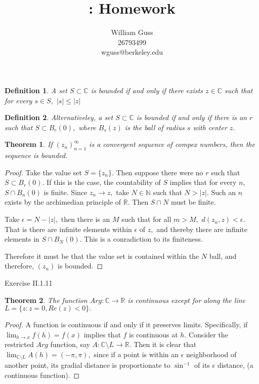 \documentclass[letter]{article}
\title{\bCLASS: Homework \bHWN}
\author{William Guss\\26793499\\wguss@berkeley.edu}
\newtheorem{theorem}{Theorem}
\newtheorem{definition}{Definition}
\newenvironment{menumerate}{%
  \edef\backupindent{\the\parindent}%
  \enumerate%
  \setlength{\parindent}{\backupindent}%
}{\endenumerate}
\begin{document}
\maketitle
\thispagestyle{empty}


\begin{menumerate}
	\item
	\begin{definition}
		A set $S \subset \mathbb{C}$ is bounded if and only if there exists $ z \in \mathbb{C}$ such that for every $s \in S,$ $|s| \leq |z|$
	\end{definition}
	\begin{definition}
		Alternativeley, a set $S \subset \mathbb{C}$ is bounded if and only if there is an $r$  such that $S \subset B_r(0),$ where $B_s(z)$ is the ball of radius $s$ with center $z.$
	\end{definition}
	\begin{theorem}
		If $(z_n)^\infty_{n=1}$ is a convergent sequence of compex numbers,
		then the sequence is bounded.
	\end{theorem}
	\begin{proof}
		Take the value set $S = \{z_n\}.$ Then suppose there were no $r$ such that $S \subset B_r(0)$. If this is the case, the countability of $S$ implies that for every $n$, $S \cap B_n(0)$ is finite.
		Since $z_n \to z,$ take $N \in \mathbb{N}$ such that $N > |z|.$ Such an $n$ exists by the archimedian principle of $\mathbb{R}.$ Then $S \cap N$ must be finite. 

		Take $\epsilon = N - |z|,$ then there is an $M$ such that for all $m > M,$ $d(z_n,z) < \epsilon.$ That is there are infinite elements within $\epsilon$ of $z,$ and thereby there are infinite elements in $S \cap B_N(0).$ This is a conradiction to its finiteness.

		Therefore it must be that the value set is contained within the $N$ ball, and therefore,  $(z_n)$ is bounded. 
	\end{proof} 

	\item Exercise II.1.11
	\begin{theorem}
	The function $Arg : \mathbb{C} \to \mathbb{R}$ is continuous except for along the line $L = \{z : z = 0, Re(z) < 0\}.$
	\end{theorem}
	\begin{proof}
		A function is continuous if and only if it preserves limits. Specifically, if $\lim_{h \to x} f(h) = f(x) $ implies that $f$ is continuous at $h$. Consider the restricted $Arg$ function, say $A:\mathbb{C} \setminus L \to \mathbb{R}.$ Then it is clear that $\lim_{\mathbb{C}\setminus L} A(h) = (-\pi,\pi),$ since if a point is
		within an $\epsilon$ neighborhood of another point, its gradial distance is proportionate to $\sin^{-1}$ of its $\epsilon$ distance, (a continuous function).


\end{proof}
\end{menumerate}
\end{document}
